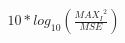 \documentclass[preview]{standalone}
\begin{document}
\begin{align*}
10*log_10(\frac{{MAX_I}^2}{MSE})
\end{align*}
\end{document}
